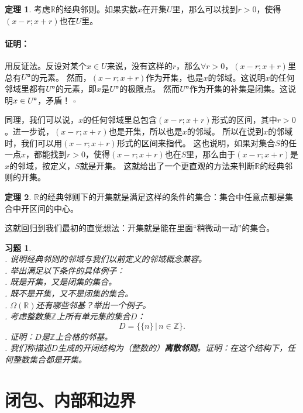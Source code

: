 \documentclass[12pt,UTF8]{ctexbook}
\newcommand{\bu}{\mathbin{\text{\tikz[baseline=-0.6ex]{
    \node[draw, fill=black, minimum size=0.8ex, inner sep=0pt, rectangle] (bu) {};
    \node[draw=none, fill=white, minimum size=0.6ex, inner sep=0pt, circle] at (bu.center) {};
}}}}
\theoremstyle{definition}
\newtheorem{tm}{定理}[section]
\theoremstyle{plain}
\newtheorem{xt}{习题}[section]
\renewenvironment{proof}{\paragraph{\textbf{证明：}}}{\hfill$\square$}
\begin{document}
\begin{appendix}
\begin{tm}\label{tm:a-1-30}
    考虑$\mathbb{R}$的经典邻则。如果实数$x$在开集$U$里，那么可以找到$r>0$，使得$(x-r;x+r)$也在$U$里。
\end{tm}

\begin{proof}
    用反证法。反设对某个$x\in U$来说，没有这样的$r$，那么$\forall r>0$，$(x-r;x+r)$里总有$U^{\bu}$的元素。
    然而，$(x-r;x+r)$作为开集，也是$x$的邻域。这说明$x$的任何邻域里都有$U^{\bu}$的元素，即$x$是$U^{\bu}$的极限点。
    然而$U^{\bu}$作为开集的补集是闭集。这说明$x\in U^{\bu}$，矛盾！
\end{proof}

同理，我们可以说，$x$的任何邻域里总包含$(x-r;x+r)$形式的区间，其中$r>0$。进一步说，$(x-r;x+r)$也是开集，所以也是$x$的邻域。
所以在说到$x$的邻域时，我们可以用$(x-r;x+r)$形式的区间来指代。
这也说明，如果对集合$S$的任一点$x$，都能找到$r>0$，使得$(x-r;x+r)$也在$S$里，那么由于$(x-r;x+r)$是$x$的邻域，按定义，$S$就是开集。
这就给出了一个更直观的方法来判断$\mathbb{R}$的经典邻则的开集。

\begin{tm}\label{tm:a-1-40}
    $\mathbb{R}$的经典邻则下的开集就是满足这样的条件的集合：集合中任意点都是集合中开区间的中心。
\end{tm}
这就回归到我们最初的直觉想法：开集就是能在里面“稍微动一动”的集合。

\begin{xt}
    \mbox{} \\
    . 说明经典邻则的邻域与我们以前定义的邻域概念兼容。\\
    . 举出满足以下条件的具体例子：\\
    . 既是开集，又是闭集的集合。\\
    . 既不是开集，又不是闭集的集合。\\
    . $\Omega(\mathbb{R})$还有哪些邻基？举出一个例子。\\
    . 考虑整数集$\mathbb{Z}$上所有单元集的集合$D$：
    $$ D = \{\{n\} \, | \, n \in  \mathbb{Z}\}.$$
    . 证明：$D$是$\mathbb{Z}$上合格的邻基。\\
    . 我们称描述$D$生成的开闭结构为（整数的）\textbf{离散邻则}。证明：在这个结构下，任何整数集合都是开集。
\end{xt}

\section{闭包、内部和边界}


\end{appendix}
\end{document}
